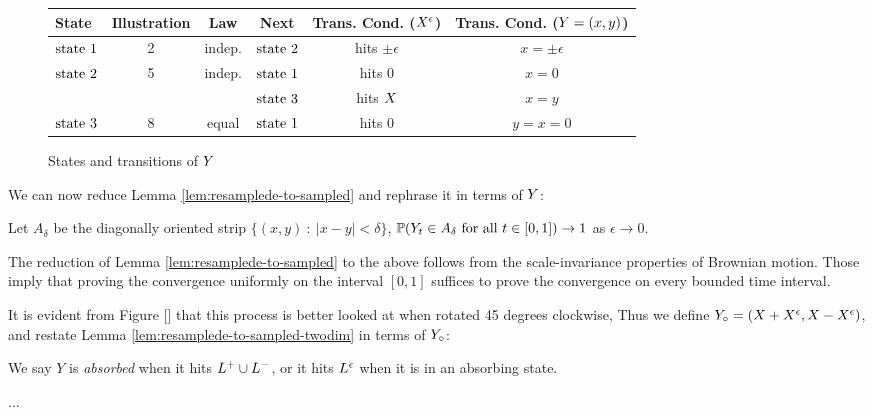 {\begin{figure}\label{fig:twodimtranstab}
\begin{center}
  \begin{tabular}{| l || c | c | c | c | c | }
    \hline
    State & Illustration & Law & Next & Trans. Cond. ($X^{\epsilon}$) & Trans. Cond. ($Y=(x,y)$) \\
    \hline
    \hline
    $\text{state }1$ & 2 & indep. & $\text{state }2$ & hits $\pm\epsilon$ & $x=\pm\epsilon$ \\
    \hline
    \multirow{2}{*}{$\text{state }2$} & \multirow{2}{*}{5} & \multirow{2}{*}{indep.} & $\text{state }1$ & hits $0$ & $x=0$ \\ \cline{4-6}
        &  &  & $\text{state }3$ & hits $X$ & $x=y$\\
    \hline
    $\text{state }3$  & 8 & equal & $\text{state }1$ &  hits $0$ & $y=x=0$\\
    \hline
  \end{tabular}
\end{center}
\caption{States and transitions of $Y$}
\end{figure}

We can now reduce Lemma \ref{lem:resamplede-to-sampled} and rephrase it in terms of $Y$:
\begin{lemma}\label{lem:resamplede-to-sampled-twodim}
Let $A_\delta$ be the diagonally oriented strip $\{(x,y) \ :\  |x-y|<\delta \}$, 
$\mathbb{P}(Y_t \in A_\delta \text{ for all } t \in [0,1])\to1$ as $\epsilon\to 0$.
\end{lemma}
The reduction of Lemma \ref{lem:resamplede-to-sampled} to the above
follows from the scale-invariance properties of Brownian motion. Those
imply that proving the convergence uniformly on the interval $[0,1]$
suffices to prove the convergence on every bounded time interval.

It is evident from Figure [] that this process is better looked at when rotated 45 degrees clockwise,
Thus we define $Y_\circ = (X + X^{\epsilon}, X - X^{\epsilon})$, and restate Lemma \ref{lem:resamplede-to-sampled-twodim} in terms of $Y_\circ$: 

\begin{definition}
  We say $Y$ is \emph{absorbed} when it hits $L^+ \cup L^-$, or it hits $L^\epsilon$
  when it is in an absorbing state.
\end{definition}

...

}
